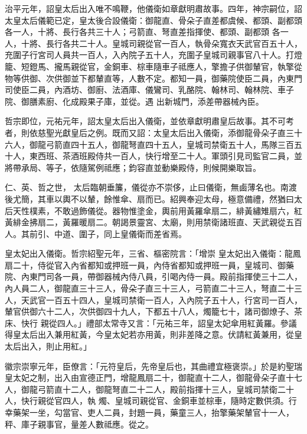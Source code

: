\begin{pinyinscope}
 治平元年，詔皇太后出入唯不鳴鞭，他儀衛如章獻明肅故事。四年，神宗嗣位，詔太皇太后儀範已定，皇太後合設儀衛：御龍直、骨朵子直差都虞候、都頭、副都頭各一人，十將、長行各共三十人；弓箭直、弩直差指揮使、都頭、副都頭
 各一人，十將、長行各共二十人。皇城司親從官一百人，執骨朵寬衣天武官百五十人，充圍子行宮司人員共一百人，入內院子五十人，充圍子皇城司親事官八十人。打燈籠、短鐙馬、攏馬親從官，金銅車、棕車隨車子祗應人，擎擔子供御輦官，執擎從物等供御、次供御並下都輦直等，人數不定。都知一員，御藥院使臣二員，內東門司使臣二員，內酒坊、御廚、法酒庫、儀鸞司、乳酪院、翰林司、翰林院、車子院、御膳素廚、化成殿果子庫，並從。遇
 出新城門，添差帶器械內臣。



 哲宗即位，元祐元年，詔太皇太后出入儀衛，並依章獻明肅皇后故事。其不可考者，則依慈聖光獻皇后之例。既而又詔：太皇太后出入儀衛，添御龍骨朵子直三十六人，御龍弓箭直四十五人，御龍弩直四十五人，皇城司禁衛五十人，馬隊三百五十人，東西班、茶酒班殿侍共一百人，快行增至二十人。軍頭引見司監官二員，並將帶承局、等子，依隨駕例祗應；鈞容直並動樂殿侍，則候開樂取旨。



 仁、英、哲之世，
 太后臨朝垂簾，儀從亦不崇侈，止曰儀衛，無鹵薄名也。南渡後尤簡，其車以輿不以輦，餘惟傘、扇而已。紹興奉迎太母，極意備禮，然猶曰太后天性樸素，不敢過飾儀從。器物惟塗金，輿前用黃羅傘扇二，緋黃繡雉扇六，紅黃緋金拂扇二，黃羅暖扇二。朝謁景靈宮、太廟，則用禁衛諸班直、天武親從五百人。其前引、中道、圍子，同上皇儀衛而差省焉。



 皇太妃出入儀衛。哲宗紹聖元年，三省、樞密院言：「增崇
 皇太妃出入儀衛：龍鳳扇二十，侍從官入內省都知或押班一員，內侍省都知或押班一員，皇城司、御藥院、內東門司各一員，帶御器械內侍八員，引喝內侍一員。殿前指揮使三十二人，內人員二人，御龍直三十三人，骨朵子直三十三人，弓箭直二十三人，弩直二十三人，天武官一百五十四人，皇城司禁衛一百人，入內院子五十人，行宮司一百人，輦官供御六十二人，次供御四十九人，下都五十八人，燭籠七十，諸司御燎子、茶床、快行
 親從四人。」禮部太常寺又言：「元祐三年，詔皇太妃傘用紅黃羅。參議得皇太后出入兼用紅黃，今皇太妃若亦用黃，則非差降之意。伏請紅黃兼用，從皇太后出入，則止用紅。」



 徽宗崇寧元年，臣僚言：「元符皇后，先帝皇后也，其曲禮宜極褒崇。」於是約聖瑞皇太妃之制，出入由宣德正門，增龍鳳扇二十，御龍直十二人，御龍骨朵子直十七人，御龍弓箭直十二人，御龍弩直二十二人，殿前指揮十三人，皇城司禁衛二十人，快行親從官四人，執
 燭、皇城司親從官、金銅車並棕車，隨時定數供須。行幸藥架一坐，勾當官、吏人二員，封題一員，藥童三人，抬擎藥架輦官十一人，秤、庫子親事官，量差人數祗應。從之。




\end{pinyinscope}
